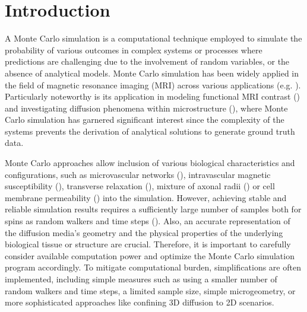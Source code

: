 
\section{Introduction}

A Monte Carlo simulation is a computational technique employed to simulate the probability of various outcomes in complex systems or processes where predictions are challenging due to the involvement of random variables, or the absence of analytical models. Monte Carlo simulation has been widely applied in the field of magnetic resonance imaging (MRI) across various applications (e.g. \cite{harkins2021simple, baxter2013computational, storey2024signatures, soher2001representation, garpebring2013uncertainty, prange2009quantifying}). Particularly noteworthy is its application in modeling functional MRI contrast (\cite{baez2017impact, khajehim2017investigating, martindale2008theory}) and investigating diffusion phenomena within microstructure (\cite{rafael2020robust, yeh2013diffusion, lee2021realistic}), where Monte Carlo simulation has garnered significant interest since the complexity of the systems prevents the derivation of analytical solutions to generate ground truth data.


Monte Carlo approaches allow inclusion of various biological characteristics and configurations, such as microvascular networks (\cite{baez2017impact}), intravascular magnetic susceptibility (\cite{boxerman1995mr}), transverse relaxation (\cite{weisskoff1994microscopic}), mixture of axonal radii (\cite{lee2020impact}) or cell membrane permeability (\cite{yeh2013diffusion}) into the simulation. However, achieving stable and reliable simulation results requires a sufficiently large number of samples both for spins as random walkers and time steps (\cite{fieremans2018physical}). Also,  an accurate representation of the diffusion media's geometry and the physical properties of the underlying biological tissue or structure are crucial. Therefore, it is important to carefully consider available computation power and optimize the Monte Carlo simulation program accordingly. To mitigate computational burden, simplifications are often implemented, including simple measures such as using a smaller number of random walkers and time steps, a limited sample size, simple microgeometry, or more sophisticated approaches like confining 3D diffusion to 2D scenarios.


